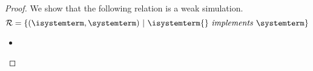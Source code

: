 \begin{proof} We show that the following relation is a weak simulation.
\[
\mathcal{R} = \{ (\isystemterm, \systemterm) \ |\ \implements{\isystemterm{}}{\systemterm} \}
\]





\begin{itemize}
   
	
   \item%
   

\end{itemize}
\end{proof}
